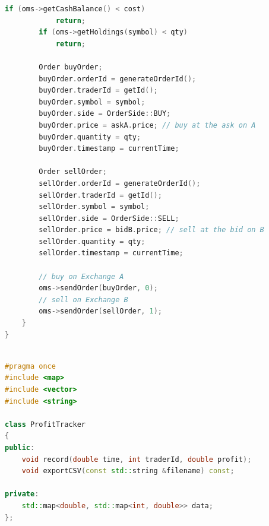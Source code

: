 \documentclass[11pt, a4paper]{article}
\begin{document}
\begin{tcolorbox}[codefile, title={\texttt{FastTrader.cpp}}]
\begin{lstlisting}[language=C++, numbers=none, caption={}]
        if (oms->getCashBalance() < cost)
            return;
        if (oms->getHoldings(symbol) < qty)
            return;

        Order buyOrder;
        buyOrder.orderId = generateOrderId();
        buyOrder.traderId = getId();
        buyOrder.symbol = symbol;
        buyOrder.side = OrderSide::BUY;
        buyOrder.price = askA.price; // buy at the ask on A
        buyOrder.quantity = qty;
        buyOrder.timestamp = currentTime;

        Order sellOrder;
        sellOrder.orderId = generateOrderId();
        sellOrder.traderId = getId();
        sellOrder.symbol = symbol;
        sellOrder.side = OrderSide::SELL;
        sellOrder.price = bidB.price; // sell at the bid on B
        sellOrder.quantity = qty;
        sellOrder.timestamp = currentTime;

        // buy on Exchange A
        oms->sendOrder(buyOrder, 0);
        // sell on Exchange B
        oms->sendOrder(sellOrder, 1);
    }
}

\end{lstlisting}
\end{tcolorbox}

\vspace{0.6em}

\begin{tcolorbox}[codefile, title={\texttt{ProfitTracker.h}}]
\begin{lstlisting}[language=C++, numbers=none, caption={}]

#pragma once
#include <map>
#include <vector>
#include <string>

class ProfitTracker
{
public:
    void record(double time, int traderId, double profit);
    void exportCSV(const std::string &filename) const;

private:
    std::map<double, std::map<int, double>> data;
};

\end{lstlisting}
\end{tcolorbox}

\vspace{0.6em}
\end{document}

